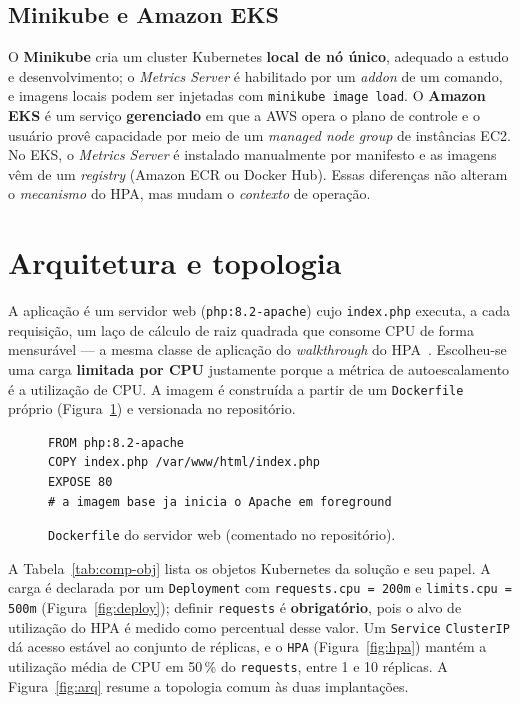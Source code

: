 \documentclass[conference]{IEEEtran}
\begin{document}
\subsection{Minikube e Amazon EKS}
O \textbf{Minikube} cria um cluster Kubernetes \textbf{local de nó único}, adequado a estudo e
desenvolvimento; o \textit{Metrics Server} é habilitado por um \textit{addon} de um comando, e
imagens locais podem ser injetadas com \texttt{minikube image load}. O \textbf{Amazon EKS} é um
serviço \textbf{gerenciado} em que a AWS opera o plano de controle e o usuário provê capacidade
por meio de um \textit{managed node group} de instâncias EC2. No EKS, o \textit{Metrics Server}
é instalado manualmente por manifesto e as imagens vêm de um \textit{registry} (Amazon ECR ou
Docker Hub). Essas diferenças não alteram o \emph{mecanismo} do HPA, mas mudam o \emph{contexto}
de operação.

\section{Arquitetura e topologia}\label{sec:arq}
A aplicação é um servidor web (\texttt{php:8.2-apache}) cujo \texttt{index.php} executa, a cada
requisição, um laço de cálculo de raiz quadrada que consome CPU de forma mensurável --- a mesma
classe de aplicação do \textit{walkthrough} do HPA~\cite{k8shpa}. Escolheu-se uma carga
\textbf{limitada por CPU} justamente porque a métrica de autoescalamento é a utilização de CPU. A
imagem é construída a partir de um \texttt{Dockerfile} próprio (Figura~\ref{fig:dockerfile}) e
versionada no repositório.

\begin{figure}[!t]
\footnotesize
\begin{verbatim}
FROM php:8.2-apache
COPY index.php /var/www/html/index.php
EXPOSE 80
# a imagem base ja inicia o Apache em foreground
\end{verbatim}
\caption{\texttt{Dockerfile} do servidor web (comentado no repositório).}
\label{fig:dockerfile}
\end{figure}

A Tabela~\ref{tab:comp-obj} lista os objetos Kubernetes da solução e seu papel. A carga é
declarada por um \texttt{Deployment} com \texttt{requests.cpu = 200m} e \texttt{limits.cpu =
500m} (Figura~\ref{fig:deploy}); definir \texttt{requests} é \textbf{obrigatório}, pois o alvo de
utilização do HPA é medido como percentual desse valor. Um \texttt{Service} \texttt{ClusterIP} dá
acesso estável ao conjunto de réplicas, e o \texttt{HPA} (Figura~\ref{fig:hpa}) mantém a
utilização média de CPU em 50\,\% do \texttt{requests}, entre 1 e 10 réplicas.
A Figura~\ref{fig:arq} resume a topologia comum às duas implantações.
\end{document}
